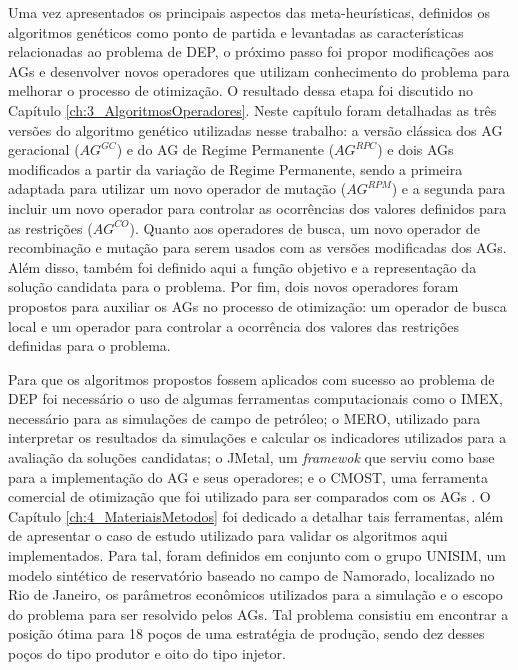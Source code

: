 Uma vez apresentados os principais aspectos das meta-heurísticas, definidos os algoritmos genéticos como ponto de partida e levantadas as características relacionadas ao problema de DEP, o próximo passo foi propor modificações aos AGs e desenvolver novos operadores que utilizam conhecimento do problema para melhorar o processo de otimização. O resultado dessa etapa foi discutido no Capítulo \ref{ch:3_AlgoritmosOperadores}. Neste capítulo foram detalhadas as três versões do algoritmo genético utilizadas nesse trabalho: a versão clássica dos AG geracional ($AG^{GC}$) e do AG de Regime Permanente ($AG^{RPC}$) e dois AGs modificados a partir da variação de Regime Permanente, sendo a primeira adaptada para utilizar um novo operador de mutação ($AG^{RPM}$) e a segunda para incluir um novo operador para controlar as ocorrências dos valores definidos para as restrições ($AG^{CO}$). Quanto aos operadores de busca, um novo operador de recombinação e mutação para serem usados com as versões modificadas dos AGs. Além disso, também foi definido aqui a função objetivo e a representação da solução candidata para o problema. Por fim, dois novos operadores foram propostos para auxiliar os AGs no processo de otimização: um operador de busca local e um operador para controlar a ocorrência dos valores das restrições definidas para o problema.

Para que os algoritmos propostos fossem aplicados com sucesso ao problema de DEP foi necessário o uso de algumas ferramentas computacionais como o IMEX, necessário para as simulações de campo de petróleo; o MERO, utilizado para interpretar os resultados da simulações e calcular os indicadores utilizados para a avaliação da soluções candidatas; o JMetal, um \textit{framewok} que serviu como base para a implementação do AG e seus operadores; e o CMOST, uma ferramenta comercial de otimização que foi utilizado para ser comparados com os AGs . O Capítulo \ref{ch:4_MateriaisMetodos} foi dedicado a detalhar tais ferramentas, além de apresentar o caso de estudo utilizado para validar os algoritmos aqui implementados. Para tal, foram definidos em conjunto com o grupo UNISIM, um modelo sintético de reservatório baseado no campo de Namorado, localizado no Rio de Janeiro, os parâmetros econômicos utilizados para a simulação e o escopo do problema para ser resolvido pelos AGs. Tal problema consistiu em encontrar a posição ótima para 18 poços de uma estratégia de produção, sendo dez desses poços do tipo produtor e oito do tipo injetor.

